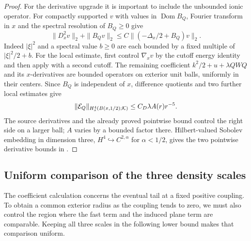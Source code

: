 \begin{proof}
For the derivative upgrade it is important to include the unbounded
ionic operator.  For compactly supported \(v\) with values in
\(\operatorname{Dom}B_Q\), Fourier transform in \(x\) and the
spectral resolution of \(B_Q\geq0\) give
\begin{equation}
 \|D_x^2v\|_2+\|B_Qv\|_2
 \leq C\|(-\Delta_x/2+B_Q)v\|_2.
 \label{eq:positive-ionic-elliptic-estimate}
\end{equation}
Indeed \(|\xi|^2\) and a spectral value \(b\geq0\) are each bounded
by a fixed multiple of \(|\xi|^2/2+b\).
For the local estimate, first control \(\nabla_xv\) by the
cutoff energy identity and then apply
 with a second cutoff.
The remaining coefficient \(k^2/2+u+\lambda QWQ\) and its
\(x\)-derivatives are bounded operators on exterior unit balls,
uniformly in their centers.  Since \(B_Q\) is independent of \(x\),
difference quotients and two further local estimates give
\[
 \|\mathcal E_Q\|_{H_x^4(B(x,1/2);\mathcal K)}
 \leq C_D\lambda A(r)r^{-5}.
 \]
The source derivatives and the already proved pointwise bound
control the right side on a larger ball; \(A\) varies by a bounded
factor there.  Hilbert-valued Sobolev embedding in dimension three,
\(H^4\hookrightarrow C^{2,\alpha}\) for \(\alpha<1/2\), gives
the two pointwise derivative bounds in
.
\end{proof}

\subsection{Uniform comparison of the three density scales}

The coefficient calculation concerns the eventual tail at a fixed
positive coupling.  To obtain a common exterior radius as the coupling
tends to zero, we must also control the region where the fast term and
the induced plane term are comparable.  Keeping all three scales in
the following lower bound makes that comparison uniform.

